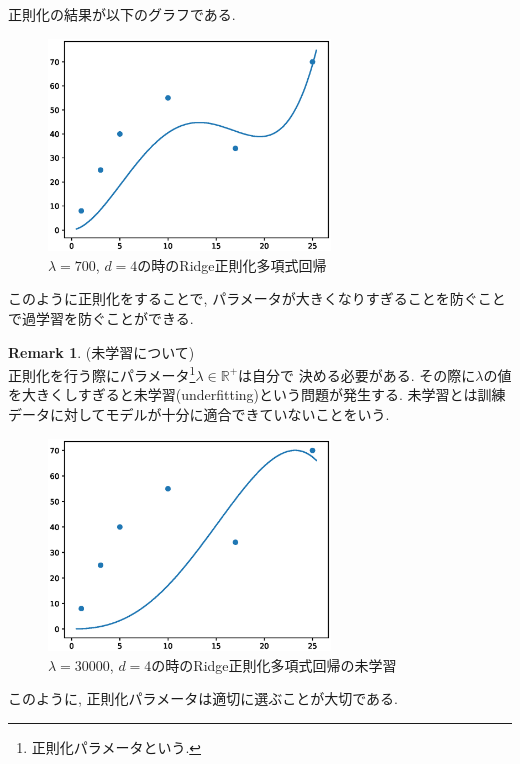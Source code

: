 \documentclass[11pt, a4paper, dvipdfmx]{jsarticle}
\theoremstyle{definition}
\newtheorem{Remark+}[Axiom+]{Remark}
\newcommand{\R}{\mathbb{R}}
\begin{document}
正則化の結果が以下のグラフである.
\begin{figure}[H]
    \centering
    \includegraphics[width = 7.5cm]{Images/regulared_PR.eps}
    \caption{$\lambda = 700$, $d = 4$の時のRidge正則化多項式回帰}
\end{figure}
このように正則化をすることで, パラメータが大きくなりすぎることを防ぐことで過学習を防ぐことができる.
\begin{Remark+}(未学習について)\\
    正則化を行う際にパラメータ\footnote{正則化パラメータという.}$\lambda\in\R^+$は自分で
    決める必要がある. その際に$\lambda$の値を大きくしすぎると未学習(underfitting)という問題が発生する.
    未学習とは訓練データに対してモデルが十分に適合できていないことをいう.
    \begin{figure}[H]
        \centering
        \includegraphics[width=7.5cm]{Images/underfitting_PR.eps}
        \caption{$\lambda = 30000$, $d = 4$の時のRidge正則化多項式回帰の未学習}
    \end{figure}
    このように, 正則化パラメータは適切に選ぶことが大切である. 
\end{Remark+}
\end{document}
